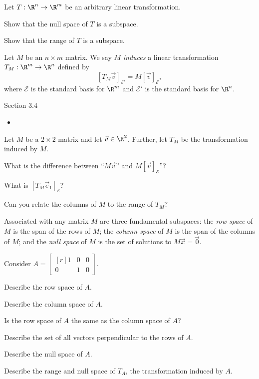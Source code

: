 \documentclass{problemset}
\newcommand{\mat}[1]{\begin{bmatrix*}[r]#1\end{bmatrix*}}
\begin{document}
	\question
	Let $T:\R^n\to\R^m$ be an arbitrary linear transformation.
	\begin{parts}
		\item Show that the null space of $T$ is a subspace.
		\item Show that the range of $T$ is a subspace.
	\end{parts}

	\begin{definition}
		Let $M$ be an $n\times m$ matrix. We say $M$ \emph{induces} 
		a linear transformation $T_M:\R^m\to\R^n$ defined by
		\[
			[T_M\vec v]_{\mathcal E'} = M[\vec v]_{\mathcal E},
		\]
		where $\mathcal E$ is the standard basis for $\R^m$ and $\mathcal E'$
		is the standard basis for $\R^n$.
	\end{definition}

\begin{lesson}
	\newpage

	Section 3.4

	\begin{itemize}
		\item 
	\end{itemize}


	\newpage
\end{lesson}
	\question
	Let $M$ be a $2\times 2$ matrix and let $\vec v\in\R^2$. Further, let $T_M$
	be the transformation induced by $M$.
	\begin{parts}
		\item What is the difference between
			``$M\vec v$'' and $M[\vec v]_{\mathcal E}$''?
		\item What is $[T_M\vec e_1]_{\mathcal E}$?
		\item Can you relate the columns of $M$ to the range of $T_M$?
	\end{parts}


	\begin{definition}
		Associated with any matrix $M$ are three fundamental subspaces: the \emph{row space}
		of $M$ is the span of the rows of $M$; the \emph{column space} of $M$ is the span
		of the columns of $M$; and the \emph{null space} of $M$ is the set of solutions
		to $M\vec x=\vec 0$. 
		
	\end{definition}

	\question
	Consider $A=\mat{1&0&0\\0&1&0}$.
	\begin{parts}
		\item Describe the row space of $A$.
		\item Describe the column space of $A$.
		\item Is the row space of $A$ the same as the column space of $A$?
		\item Describe the set of all vectors perpendicular to the rows of $A$.
		\item Describe the null space of $A$.
		\item Describe the range and null space of $T_A$, the transformation induced
			by $A$.
	\end{parts}
\end{document}
